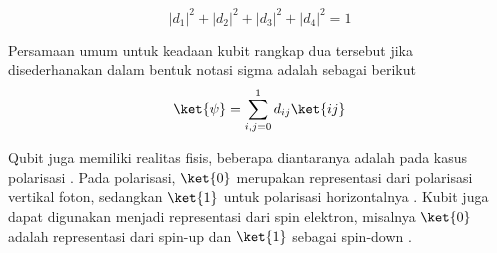 \begin{equation}
    |d_1|^2+|d_2|^2+|d_3|^2+|d_4|^2=1
\end{equation}
\par
Persamaan umum untuk keadaan kubit rangkap dua tersebut jika disederhanakan dalam bentuk notasi sigma adalah sebagai berikut
\begin{equation}
    \ket{\psi}=\sum_{i,j=0}^{1} d_{ij} \ket{ij}
\end{equation}
\par
Qubit juga memiliki realitas fisis, beberapa diantaranya adalah pada kasus polarisasi \cite{nielsen2010quantum}. Pada polarisasi, $\ket{0}$ merupakan representasi dari polarisasi vertikal foton, sedangkan $\ket{1}$ untuk polarisasi horizontalnya \cite{kok2007linear}. Kubit juga dapat digunakan menjadi representasi dari spin elektron, misalnya $\ket{0}$ adalah representasi dari spin-up dan $\ket{1}$ sebagai spin-down \cite{sakurai2017modern}.

